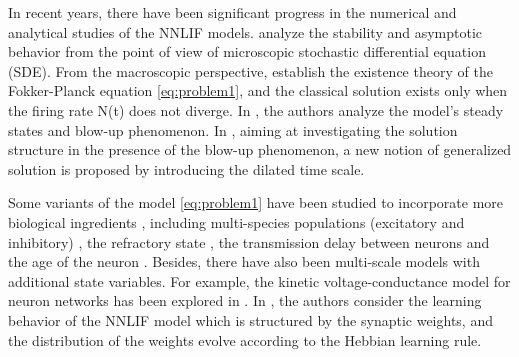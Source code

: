 In recent years, there have been significant progress in the numerical and analytical studies of the NNLIF models.
\cite{delarue2015global}\cite{delarue2015particle}\cite{caceres2020understanding} analyze the stability and asymptotic behavior from the point of view of microscopic stochastic differential equation (SDE). From the macroscopic perspective, \cite{caceres2011analysis}\cite{carrillo2013classical}\cite{carrillo2015qualitative} establish the existence theory of the Fokker-Planck equation \eqref{eq:problem1}, and the classical solution exists only when  the firing rate N(t) does not diverge. In \cite{caceres2011analysis}, the authors analyze the model's steady states and blow-up phenomenon. In \cite{dou2022dilating}, aiming at investigating the solution structure in the presence of the blow-up phenomenon, a new notion of generalized solution is proposed by introducing the dilated time scale.

Some variants of the model \eqref{eq:problem1} have been studied to incorporate more biological ingredients \cite{caceres2018analysis}, including multi-species populations (excitatory and inhibitory) \cite{caceres2016blow}, the refractory state \cite{caceres2014beyond}\cite{sharma2020discontinuous}, the transmission delay between neurons \cite{caceres2019global}\cite{hu2021structure}\cite{sharma2020discontinuous} and the age of the neuron \cite{dumont2016noisy}. Besides, there have also been multi-scale models with additional state variables. For example, the kinetic voltage-conductance model for neuron networks has been explored in \cite{caceres2011numerical}\cite{dou2022bounds}\cite{carrillo2022simplified}.  In \cite{he2022structure}\cite{perthame2017distributed}, the authors consider the learning behavior of the NNLIF model which is structured by the synaptic weights, and the distribution of the weights evolve according to the Hebbian learning rule. 

